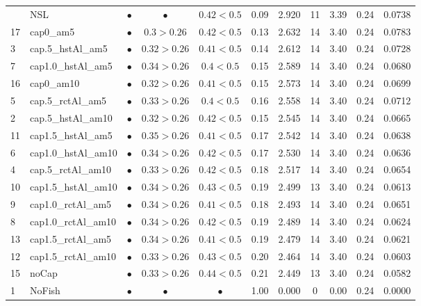 \documentclass[11pt]{book}
\begin{document}
\begin{landscape}
\begin{longtable}[t]{llccccccccc}
\midrule
\endhead
\
\endfoot
\bottomrule
\endlastfoot
14 & NSL & $\bullet$ & $\bullet$ & $0.42<0.5$ & 0.09 & 2.920 & 11 & 3.39 & 0.24 & 0.0738\\
17 & cap0\_am5 & $\bullet$ & $0.3>0.26$ & $0.42<0.5$ & 0.13 & 2.632 & 14 & 3.40 & 0.24 & 0.0783\\
3 & cap.5\_hstAl\_am5 & $\bullet$ & $0.32>0.26$ & $0.41<0.5$ & 0.14 & 2.612 & 14 & 3.40 & 0.24 & 0.0728\\
7 & cap1.0\_hstAl\_am5 & $\bullet$ & $0.34>0.26$ & $0.4<0.5$ & 0.15 & 2.589 & 14 & 3.40 & 0.24 & 0.0680\\
16 & cap0\_am10 & $\bullet$ & $0.32>0.26$ & $0.41<0.5$ & 0.15 & 2.573 & 14 & 3.40 & 0.24 & 0.0699\\
5 & cap.5\_rctAl\_am5 & $\bullet$ & $0.33>0.26$ & $0.4<0.5$ & 0.16 & 2.558 & 14 & 3.40 & 0.24 & 0.0712\\
2 & cap.5\_hstAl\_am10 & $\bullet$ & $0.32>0.26$ & $0.42<0.5$ & 0.15 & 2.545 & 14 & 3.40 & 0.24 & 0.0665\\
11 & cap1.5\_hstAl\_am5 & $\bullet$ & $0.35>0.26$ & $0.41<0.5$ & 0.17 & 2.542 & 14 & 3.40 & 0.24 & 0.0638\\
6 & cap1.0\_hstAl\_am10 & $\bullet$ & $0.34>0.26$ & $0.42<0.5$ & 0.17 & 2.530 & 14 & 3.40 & 0.24 & 0.0636\\
4 & cap.5\_rctAl\_am10 & $\bullet$ & $0.33>0.26$ & $0.42<0.5$ & 0.18 & 2.517 & 14 & 3.40 & 0.24 & 0.0654\\
10 & cap1.5\_hstAl\_am10 & $\bullet$ & $0.34>0.26$ & $0.43<0.5$ & 0.19 & 2.499 & 13 & 3.40 & 0.24 & 0.0613\\
9 & cap1.0\_rctAl\_am5 & $\bullet$ & $0.34>0.26$ & $0.41<0.5$ & 0.18 & 2.493 & 14 & 3.40 & 0.24 & 0.0651\\
8 & cap1.0\_rctAl\_am10 & $\bullet$ & $0.34>0.26$ & $0.42<0.5$ & 0.19 & 2.489 & 14 & 3.40 & 0.24 & 0.0624\\
13 & cap1.5\_rctAl\_am5 & $\bullet$ & $0.34>0.26$ & $0.41<0.5$ & 0.19 & 2.479 & 14 & 3.40 & 0.24 & 0.0621\\
12 & cap1.5\_rctAl\_am10 & $\bullet$ & $0.33>0.26$ & $0.43<0.5$ & 0.20 & 2.464 & 14 & 3.40 & 0.24 & 0.0603\\
15 & noCap & $\bullet$ & $0.33>0.26$ & $0.44<0.5$ & 0.21 & 2.449 & 13 & 3.40 & 0.24 & 0.0582\\
1 & NoFish & $\bullet$ & $\bullet$ & $\bullet$ & 1.00 & 0.000 & 0 & 0.00 & 0.24 & 0.0000\\*
\end{longtable}
\end{landscape}
\endgroup{}
\end{document}
